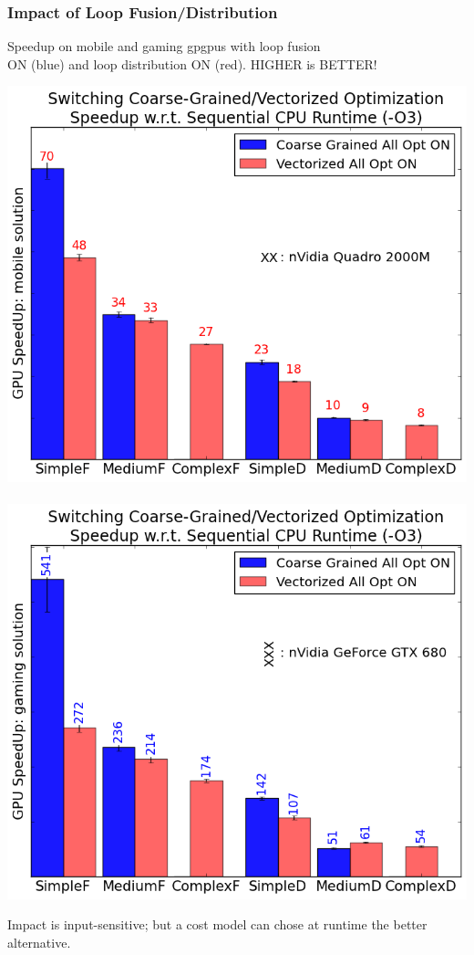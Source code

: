 \documentclass{beamer}
\newcommand{\emphb}[1]{\textcolor{CosBlue}{ #1}}
\newcommand{\empr}[1]{\textcolor{CosRed}{ #1}}
\begin{document}
\begin{frame}[fragile,t]
  \frametitle{Impact of Loop Fusion/Distribution}

Speedup on mobile and gaming {\sc gpgpu}s with loop fusion \\ 
\emphb{ON} (blue) and loop distribution \empr{ON} (red). HIGHER is BETTER!
\smallskip
\begin{center} 
\includegraphics[height=25.5ex]{ParTeaserFigs/optimizations-GPU-CG-1.png} 
$\mbox{ }\mbox{ }\mbox{ }\mbox{ }$
\includegraphics[height=25.5ex]{ParTeaserFigs/optimizations-GPU-CG-0.png} 
\end{center} 
\smallskip

Impact is input-sensitive; but a cost model can chose at runtime the better alternative.

\end{frame}
\end{document}
